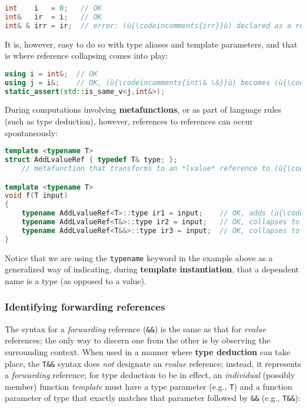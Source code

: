 \begin{lstlisting}[language=C++]
int    i   = 0;   // OK
int&   ir  = i;   // OK
int& & irr = ir;  // error: (ù{\codeincomments{irr}}ù) declared as a reference to a reference
\end{lstlisting}

\noindent It is, however, easy to do so with type aliases and template parameters,
and that is where reference collapsing comes into play:

\begin{lstlisting}[language=C++]
using i = int&;  // OK
using j = i&;    // OK, (ù{\codeincomments{int\& \&}}ù) becomes (ù{\codeincomments{int\&}}ù).
static_assert(std::is_same_v<j,int&>);
\end{lstlisting}

\noindent During computations involving \textbf{metafunctions}, or as part of
language rules (such as type deduction), however, references to
references can occur spontaneously:

\begin{lstlisting}[language=C++]
template <typename T>
struct AddLvalueRef { typedef T& type; };
    // metafunction that transforms to an *lvalue* reference to (ù{\codeincomments{T}}ù)

template <typename T>
void f(T input)
{
    typename AddLvalueRef<T>::type ir1 = input;    // OK, adds (ù{\codeincomments{\&}}ù) to make (ù{\codeincomments{T\&}}ù)
    typename AddLvalueRef<T&>::type ir2 = input;   // OK, collapses to (ù{\codeincomments{T\&}}ù)
    typename AddLvalueRef<T&&>::type ir3 = input;  // OK, collapses to (ù{\codeincomments{T\&}}ù)
}
\end{lstlisting}

\noindent Notice that we are using the \texttt{typename} keyword in the example above as a
generalized way of indicating, during \textbf{template instantiation},
that a dependent name is a type (as opposed to a value).

\subsubsection[Identifying forwarding references]{Identifying forwarding references}\label{identifying-forwarding-references}

The syntax for a \emph{forwarding} reference (\texttt{\&\&}) is the same
as that for \emph{rvalue} references; the only way to discern one from
the other is by observing the surrounding context. When used in a manner
where \textbf{type deduction} can take place, the \texttt{T\&\&} syntax
does \emph{not} designate an \emph{rvalue} reference; instead, it
represents a \emph{forwarding} reference; for type deduction to be in
effect, an \emph{individual} (possibly member) function \emph{template}
must have a type parameter (e.g., \texttt{T}) and a function parameter of
type that exactly matches that parameter followed by \texttt{\&\&}
(e.g., \texttt{T\&\&}):

